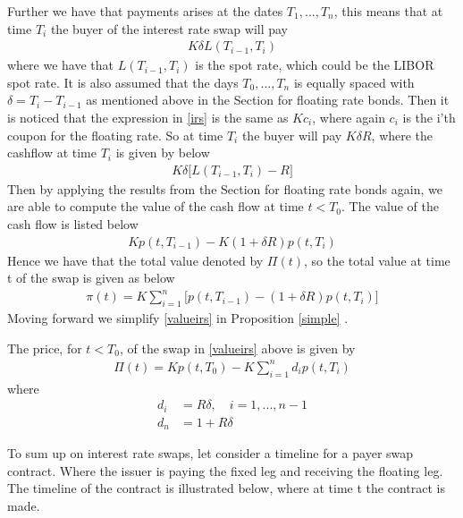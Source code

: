 Further we have that payments
arises at the dates $T_1,...,T_n$, this means that at time $T_i$ the buyer of the interest rate swap will pay
\begin{align}
    K \delta L(T_{i-1},T_i)
    \label{irs}
\end{align}
where we have that $L(T_{i-1},T_i)$ is the spot rate, which could be the LIBOR spot rate.
It is also assumed
that the days $T_0,...,T_n$ is equally spaced with $\delta = T_i - T_{i-1}$ as mentioned above in the Section for floating rate bonds. 
Then it is noticed that the expression in \autoref{irs} is the same as $Kc_i$, where again $c_i$ is the i'th coupon for the floating rate. 
So at time $T_i$ the buyer will pay $K \delta R$, where the cashflow at time $T_i$ is given by below
\begin{align*}
    K \delta \Big[L(T_{i-1},T_i)-R \Big]
\end{align*}
Then by applying the results from the Section for floating rate bonds again, we are able to compute the value of the 
cash flow at time $t<T_0$. The value of the cash flow is listed below
\begin{align*}
    K p(t,T_{i-1})-K(1+\delta R)p(t,T_i)
\end{align*}
Hence we have that the total value denoted by $\Pi(t)$, so the total value at time t of the swap is given as below
\begin{align}
    \pi (t) = K \sum_{i=1}^{n} \Big[p(t,T_{i-1})-(1+ \delta R)p(t,T_i)\Big]
    \label{valueirs}
\end{align}
Moving forward we simplify \autoref{valueirs} in Proposition \ref{simple} \cite{Bjork}.
\\
\begin{proposition}
    The price, for $t<T_0$, of the swap in \autoref{valueirs} above
    is given by 
    \begin{align*}
        \Pi(t) = K p(t,T_0)-K \sum_{i=1}^{n}d_i p(t,T_i)
    \end{align*}
    where
    \begin{align*}
        d_i &= R \delta, \quad i=1,...,n-1 \\
        d_n &= 1+ R \delta
    \end{align*}
    \label{simple}
\end{proposition}
\noindent 
To sum up on interest rate swaps, let consider a timeline for a payer swap contract. Where the issuer is paying the fixed leg 
and receiving the floating leg. The timeline of the contract is illustrated below, where at time t the contract is made. 
